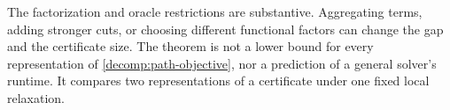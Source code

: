 The factorization and oracle restrictions are substantive. Aggregating
terms, adding stronger cuts, or choosing different functional factors can
change the gap and the certificate size. The theorem is not a lower bound
for every representation of \eqref{decomp:path-objective}, nor a prediction
of a general solver's runtime. It compares two representations of a
certificate under one fixed local relaxation.
